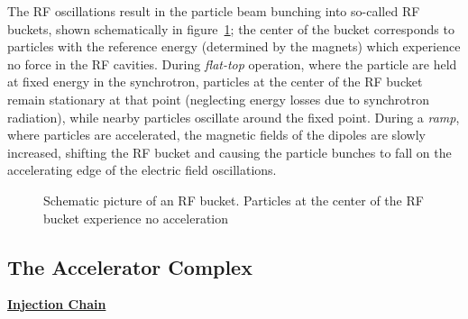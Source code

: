 The RF oscillations result in the particle beam bunching into so-called RF buckets, shown schematically in figure~\ref{fig:RF-bucket}; the center of the bucket corresponds to particles with the reference energy (determined by the magnets) which experience no force in the RF cavities. During \emph{flat-top} operation, where the particle are held at fixed energy in the synchrotron, particles at the center of the RF bucket remain stationary at that point (neglecting energy losses due to synchrotron radiation), while nearby particles oscillate around the fixed point. During a \emph{ramp}, where particles are accelerated, the magnetic fields of the dipoles are slowly increased, shifting the RF bucket and causing the particle bunches to fall on the accelerating edge of the electric field oscillations. 

\begin{figure}[htbp]
	\centering
	\caption{Schematic picture of an RF bucket. Particles at the center of the RF bucket experience no acceleration}
	\label{fig:RF-bucket}
\end{figure}

\clearpage

\subsection{The Accelerator Complex}

\underline{\textbf{Injection Chain}}

